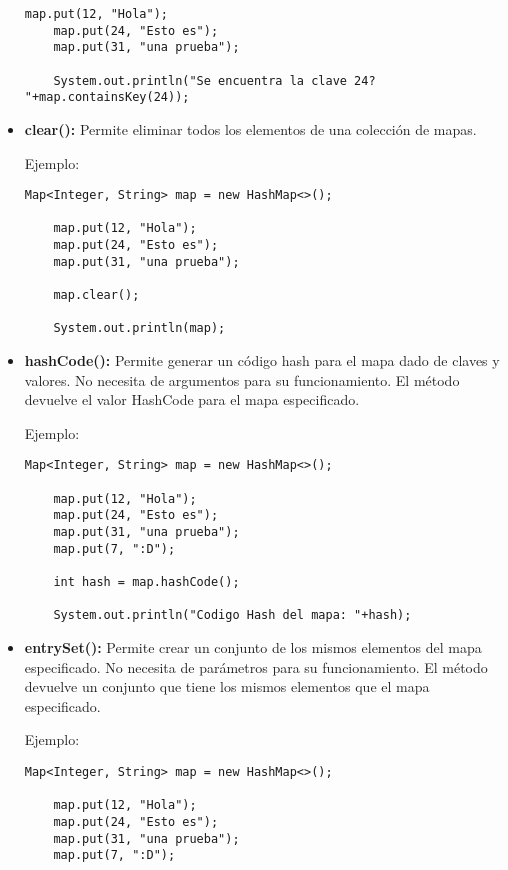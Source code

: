 \documentclass[12pt, letterpaper]{article} %
\begin{document}
\begin{itemize}
\begin{lstlisting}[frame=single]
    map.put(12, "Hola");
    map.put(24, "Esto es");
    map.put(31, "una prueba");

    System.out.println("Se encuentra la clave 24? "+map.containsKey(24));
    \end{lstlisting}

    \item \textbf{clear():} Permite eliminar todos los elementos de una colección de mapas.
    
    Ejemplo:
    \lstset{language = Java, breaklines=true, basicstyle=\footnotesize}
    \begin{lstlisting}[frame=single]
    Map<Integer, String> map = new HashMap<>();

    map.put(12, "Hola");
    map.put(24, "Esto es");
    map.put(31, "una prueba");

    map.clear();

    System.out.println(map);
    \end{lstlisting}

    \item \textbf{hashCode():} Permite generar un código hash para el mapa dado de claves y valores. No necesita de argumentos para su funcionamiento. El método devuelve el valor HashCode para el mapa especificado.

    Ejemplo:
    \lstset{language = Java, breaklines=true, basicstyle=\footnotesize}
    \begin{lstlisting}[frame=single]
    Map<Integer, String> map = new HashMap<>();

    map.put(12, "Hola");
    map.put(24, "Esto es");
    map.put(31, "una prueba");
    map.put(7, ":D");

    int hash = map.hashCode();

    System.out.println("Codigo Hash del mapa: "+hash);
    \end{lstlisting}

    \item \textbf{entrySet():} Permite crear un conjunto de los mismos elementos del mapa especificado. No necesita de parámetros para su funcionamiento. El método devuelve un conjunto que tiene los mismos elementos que el mapa especificado. 
    
    Ejemplo:
    \lstset{language = Java, breaklines=true, basicstyle=\footnotesize}
    \begin{lstlisting}[frame=single]
    Map<Integer, String> map = new HashMap<>();

    map.put(12, "Hola");
    map.put(24, "Esto es");
    map.put(31, "una prueba");
    map.put(7, ":D");


\end{lstlisting}
\end{itemize}
\end{document}
